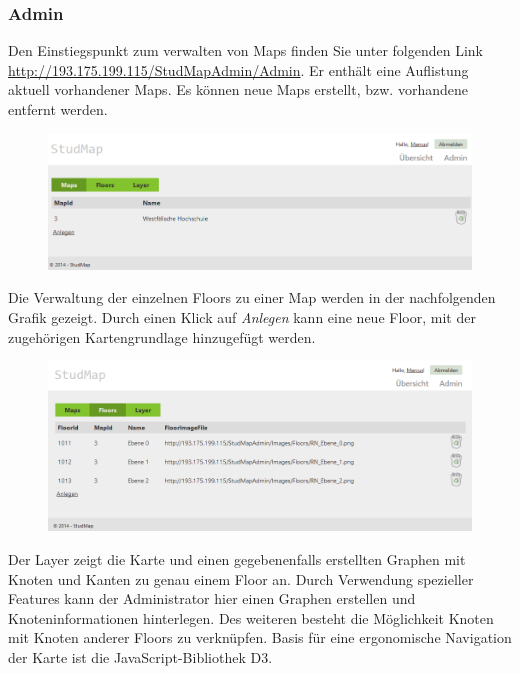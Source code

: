 \subsubsection*{Admin}
Den Einstiegspunkt zum verwalten von Maps finden Sie unter folgenden Link \\
\href{URL}{http://193.175.199.115/StudMapAdmin/Admin}. Er enthält eine Auflistung aktuell vorhandener Maps. Es  können neue Maps erstellt, bzw. vorhandene entfernt werden.
\begin{figure}[H]
\centering
\includegraphics[width=\linewidth]{../Bilder/Admin/AdminMaps}
\label{fig:AdminMaps}
\end{figure}
Die Verwaltung der einzelnen Floors zu einer Map werden in der nachfolgenden Grafik gezeigt. Durch einen Klick auf \textit{Anlegen} kann eine neue Floor, mit der zugehörigen Kartengrundlage hinzugefügt werden.
\begin{figure}[H]
\centering
\includegraphics[width=\linewidth]{../Bilder/Admin/AdminFloors}
\label{fig:AdminFloors}
\end{figure}
Der Layer zeigt die Karte und einen gegebenenfalls erstellten Graphen mit Knoten und Kanten zu genau einem Floor an.
Durch Verwendung spezieller Features kann der Administrator hier einen Graphen erstellen und Knoteninformationen hinterlegen. Des weiteren besteht die Möglichkeit Knoten mit Knoten anderer Floors zu verknüpfen. Basis für eine ergonomische Navigation der Karte ist die JavaScript-Bibliothek D3.
